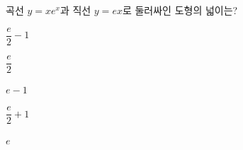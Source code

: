 \hspace*{2mm}\begin{minipage}[t]{\dimexpr\linewidth-2mm\relax}\vspace{0pt}
곡선 $y=xe^x$과 직선 $y=ex$로 둘러싸인 도형의 넓이는?
\begin{choices32}{\rule[-3ex]{0pt}{8ex}$\dfrac{e}{2}-1$}{\rule[-3ex]{0pt}{8ex}$\dfrac{e}{2}$}{\rule[-3ex]{0pt}{8ex}$e-1$}{\rule[-3ex]{0pt}{8ex}$\dfrac{e}{2}+1$}{\rule[-3ex]{0pt}{8ex}$e$}\end{choices32}\end{minipage}
